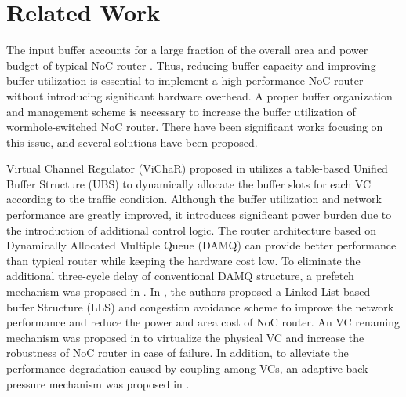 \documentclass[10pt,conference]{IEEEtran}
\begin{document}
\section{Related Work}\label{related}
The input buffer accounts for a large fraction of the overall area and power budget of typical NoC router \cite{1650108}\cite{ChPe03}. Thus, reducing buffer capacity and improving buffer utilization is essential to implement a high-performance NoC router without introducing significant hardware overhead. A proper buffer organization and management scheme is necessary to increase the buffer utilization of wormhole-switched NoC router. There have been significant works focusing on this issue, and several solutions have been proposed.

Virtual Channel Regulator (ViChaR) proposed in \cite{NPKV06} utilizes a table-based Unified Buffer Structure (UBS) to dynamically allocate the buffer slots for each VC according to the traffic condition. Although the buffer utilization and network performance are greatly improved, it introduces significant power burden due to the introduction of additional control logic. The router architecture based on Dynamically Allocated Multiple Queue (DAMQ) \cite{liu2006shared} can provide better performance than typical router while keeping the hardware cost low. To eliminate the additional three-cycle delay of conventional DAMQ structure, a prefetch mechanism was proposed in \cite{6310960}. In \cite{4555894}, the authors proposed a Linked-List based buffer Structure (LLS) and congestion avoidance scheme to improve the network performance and reduce the power and area cost of NoC router. An VC renaming mechanism was proposed in \cite{6296442} to virtualize the physical VC and increase the robustness of NoC router in case of failure. In addition, to alleviate the performance degradation caused by coupling among VCs, an adaptive back-pressure mechanism was proposed in \cite{BeckerJMD12}.
\end{document}
